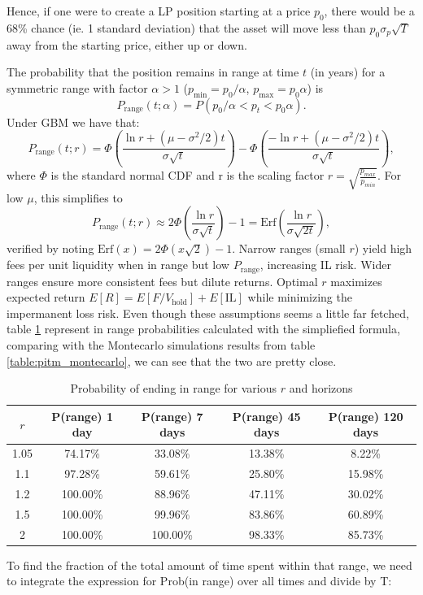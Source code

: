 \documentclass{article}
\begin{document}
 Hence, if one were to create a LP position starting at a price $p_0$, there would be a 68\% chance (ie. 1 standard deviation) that the asset will move less than $p_0\sigma_p\sqrt{T}$ away from the starting price, either up or down.\newline

The probability that the position remains in range at time $ t $ (in years) for a symmetric range with factor $\alpha > 1$ ($ p_{\min} = p_0 / \alpha $, $ p_{\max} = p_0 \alpha $) is
$$P_{\text{range}}(t; \alpha) = P\left( p_0 / \alpha < p_t < p_0 \alpha \right).$$
Under GBM we have that:
$$P_{\text{range}}(t; r) = \Phi\left( \frac{\ln r + (\mu - \sigma^2/2) t}{\sigma \sqrt{t}} \right) - \Phi\left( \frac{-\ln r + (\mu - \sigma^2/2) t}{\sigma \sqrt{t}} \right),$$
where $\Phi$ is the standard normal CDF and r is the scaling factor $r=\sqrt{\frac{p_{max}}{p_{min}}}$.
For low $\mu$, this simplifies to
$$P_{\text{range}}(t; r) \approx 2 \Phi\left( \frac{\ln r}{\sigma \sqrt{t}} \right) - 1 = \text{Erf}\left( \frac{\ln r}{\sigma \sqrt{2 t}} \right),$$
verified by noting $\text{Erf}(x) = 2 \Phi(x \sqrt{2}) - 1$.
Narrow ranges (small $r$) yield high fees per unit liquidity when in range but low $P_{\text{range}}$, increasing IL risk. Wider ranges ensure more consistent fees but dilute returns. Optimal $r$ maximizes expected return $ E[R] = E[F /V_{\text{hold}}] + E[\text{IL}] $ while minimizing the impermanent loss risk.
Even though these assumptions seems a little far fetched, table \ref{table:pitm_simplified} represent in range probabilities calculated with the simpliefied formula, comparing with the Montecarlo simulations results from table \ref{table:pitm_montecarlo}, we can see that the two are pretty close.
\begin{table}[h]
\centering
\begin{tabular}{|c|c|c|c|c|}
\hline
 $r$ & P(range) 1 day & P(range) 7 days & P(range) 45 days & P(range) 120 days \\ \hline
1.05 & 74.17\% & 33.08\% & 13.38\% & 8.22\% \\ \hline
1.1 & 97.28\% & 59.61\% & 25.80\% & 15.98\% \\ \hline
1.2 & 100.00\% & 88.96\% & 47.11\% & 30.02\% \\ \hline
1.5 & 100.00\% & 99.96\% & 83.86\% & 60.89\% \\ \hline
2 & 100.00\% & 100.00\% & 98.33\% & 85.73\% \\ \hline
\end{tabular}
\caption{Probability of ending in range for various $r$ and horizons}
\label{table:pitm_simplified}
\end{table}
To find the fraction of the total amount of time spent within that range, we need to integrate the expression for Prob(in range) over all times and divide by T:
\end{document}
